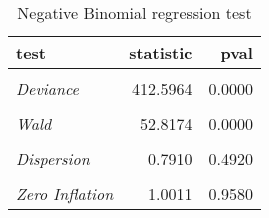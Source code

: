 \begin{table}

\caption{\label{tab:negbin_reg_tests}Negative Binomial regression test}
\centering
\begin{tabular}[t]{>{}lrr}
\toprule
test & statistic & pval\\
\midrule
\em{\cellcolor{gray!6}{Pearson}} & \cellcolor{gray!6}{1424.0269} & \cellcolor{gray!6}{0.0120}\\
\em{Deviance} & 412.5964 & 0.0000\\
\em{\cellcolor{gray!6}{LR}} & \cellcolor{gray!6}{58.9751} & \cellcolor{gray!6}{0.0000}\\
\em{Wald} & 52.8174 & 0.0000\\
\em{\cellcolor{gray!6}{Bootstrap Outliers}} & \cellcolor{gray!6}{0.0008} & \cellcolor{gray!6}{1.0000}\\
\addlinespace
\em{Dispersion} & 0.7910 & 0.4920\\
\em{\cellcolor{gray!6}{K-S Uniformity}} & \cellcolor{gray!6}{0.0217} & \cellcolor{gray!6}{0.5692}\\
\em{Zero Inflation} & 1.0011 & 0.9580\\
\bottomrule
\end{tabular}
\end{table}

